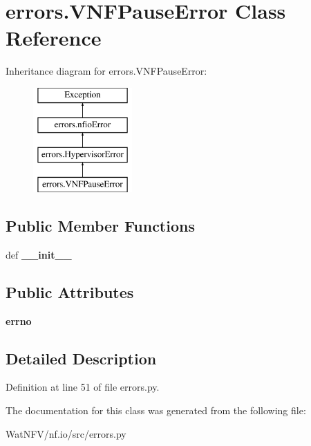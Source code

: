 \hypertarget{classerrors_1_1VNFPauseError}{\section{errors.\-V\-N\-F\-Pause\-Error Class Reference}
\label{classerrors_1_1VNFPauseError}
}
Inheritance diagram for errors.\-V\-N\-F\-Pause\-Error\-:\begin{figure}[H]
\begin{center}
\leavevmode
\includegraphics[height=4.000000cm]{classerrors_1_1VNFPauseError}
\end{center}
\end{figure}
\subsection*{Public Member Functions}
\begin{DoxyCompactItemize}
\item 
\hypertarget{classerrors_1_1VNFPauseError_af180dd953405832564b68629f76c0de2}{def {\bfseries \-\_\-\-\_\-init\-\_\-\-\_\-}}\label{classerrors_1_1VNFPauseError_af180dd953405832564b68629f76c0de2}

\end{DoxyCompactItemize}
\subsection*{Public Attributes}
\begin{DoxyCompactItemize}
\item 
\hypertarget{classerrors_1_1VNFPauseError_a410926f683c51832b1e9339b2acf8069}{{\bfseries errno}}\label{classerrors_1_1VNFPauseError_a410926f683c51832b1e9339b2acf8069}

\end{DoxyCompactItemize}


\subsection{Detailed Description}


Definition at line 51 of file errors.\-py.



The documentation for this class was generated from the following file\-:\begin{DoxyCompactItemize}
\item 
Wat\-N\-F\-V/nf.\-io/src/errors.\-py\end{DoxyCompactItemize}
